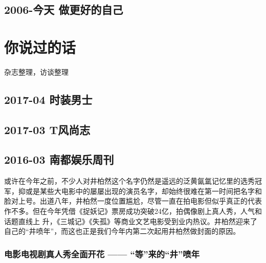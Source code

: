 \documentclass[12pt]{ctexart}
\begin{document}
\subsection{2006-今天 做更好的自己}

\newpage

\section{你说过的话}

杂志整理，访谈整理


\lipsum[1]

\fullboxbegin
\lipsum[1]
\fullboxend

\lipsum[1]
\subsection{2017-04 时装男士}
\subsection{2017-03 T风尚志}

\subsection{2016-03 南都娱乐周刊}

或许在今年之前，不少人对井柏然这个名字仍然是遥远的泛黄氤氲记忆里的选秀冠军，抑或是某些大电影中的屡屡出现的演员名字，却始终很难在第一时间把名字和脸对上号。出道八年，井柏然一度位置尴尬，尽管一直在拍电影但似乎真正的代表作不多。但在今年凭借《捉妖记》票房成功突破24亿，拍偶像剧上真人秀，人气和话题直线上 升，《三城记》《失孤》等商业文艺电影受到业内热议。井柏然迎来了自己的“井喷年”，而这也正是我们今年内第二次起用井柏然做封面的原因。

\subsubsection*{电影电视剧真人秀全面开花 —— “等”来的“井”喷年}
\end{document}
